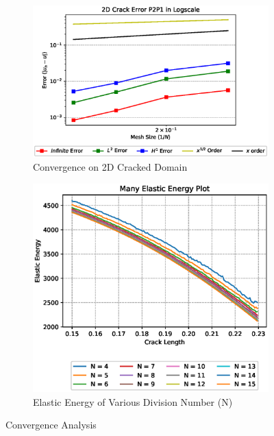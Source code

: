 \documentclass[a4paper,11pt]{article}
\begin{document}
\begin{figure}[h!]
	\begin{subfigure}[b]{0.49\linewidth}
		\centering
		\includegraphics[width=\linewidth]{picture/conference/crackerrP2P1case}
		\caption{Convergence on 2D Cracked Domain}
		\label{fig:all2dcrackerrorcase}
	\end{subfigure}
	\quad
	\begin{subfigure}[b]{0.49\linewidth}
		\centering
		\includegraphics[width=\linewidth]{picture/conference/manyelastic}
		\caption{Elastic Energy of Various Division Number (N)}
		\label{fig:manyelastic}
	\end{subfigure}
	\caption{Convergence Analysis}
	\label{fig:converganalysis}
\end{figure}
\newline
\newpage
\end{document}
